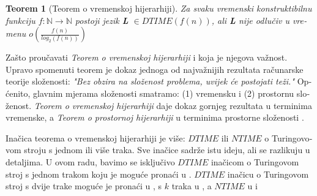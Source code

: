\documentclass[12pt]{rectors}
\newtheorem{theorem}{Teorem}[section]
\begin{document}
\begin{otherlanguage}{croatian}

\begin{theorem}[Teorem o vremenskoj hijerarhiji]
\label{timehierarhy}
Za svaku vremenski konstruktibilnu funkciju $f : \mathbb{N} \to \mathbb{N}$ postoji jezik \textbf{L} $\in DTIME(f\left ( n \right ) )$, ali \textbf{L} nije odlučiv 
u vremenu $o(\frac {f\left ( n \right )}{log_2\left ( f\left ( n \right ) \right )} )$
\end{theorem}

Zašto proučavati \textit{Teorem o vremenskoj hijerarhiji} i koja je njegova važnost. Upravo spomenuti teorem je dokaz jednoga od najvažnijih rezultata računarske teorije složenosti: \textit{"Bez obzira na složenost problema, uvijek će postojati teži."}
Općenito, glavnim mjerama složenosti smatramo: (1) vremensku i (2) prostornu složenost.
\textit{Teorem o vremenskoj hijerarhiji} daje dokaz gornjeg rezultata u terminima vremenske, a \textit{Teorem o prostornoj hijerarhiji} u terminima prostorne složenosti \cite{sipser2006}.

Inačica teorema o vremenskoj hijerarhiji je više: $DTIME$ ili $NTIME$ o Turingovovom stroju s jednom ili više traka.
Sve inačice sadrže istu ideju, ali se razlikuju u detaljima.
U ovom radu, bavimo se isključivo $DTIME$ inačicom o Turingovom stroj s jednom trakom koju je moguće pronaći u \cite{sipser2006}. 
$DTIME$ inačicu o Turingovom stroj s dvije trake moguće je pronaći u \cite{teorem2trake},
s $k$ traka u \cite{teoremktraka}, a $NTIME$ u \cite{teoremntime} i \cite{teoremntime2}


\end{otherlanguage}
\end{document}
